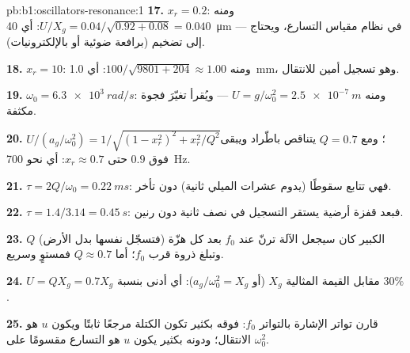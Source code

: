 \begin{solution}{pb:b1:oscillators-resonance:1}
\textbf{17.} $x_r = 0.2$: ومنه $U/X_g = 0.04/\sqrt{0.92 + 0.08} = 0.040$: أي
\qty{40}{\micro m} --- في نظام مقياس التسارع، ويحتاج إلى تضخيم (برافعة
ضوئية أو بالإلكترونيات).

\textbf{18.} $x_r = 10$: ومنه $100/\sqrt{9801 + 204} \approx 1.00$: أي \qty{1.0}{mm}،
وهو تسجيل أمين للانتقال.

\textbf{19.} $\omega_0 = \qty{6.3e3}{rad/s}$: ومنه $U = g/\omega_0^2 = \qty{2.5e-7}{m}$
--- ويُقرأ تغيّرَ فجوة مكثفة.

\textbf{20.} $U/(a_g/\omega_0^2) = 1/\sqrt{(1 - x_r^2)^2 + x_r^2/Q^2}$؛ ومع
$Q = 0.7$ يتناقص باطّراد ويبقى فوق $0.9$ حتى
$x_r \approx 0.7$: أي نحو \qty{700}{Hz}.

\textbf{21.} $\tau = 2Q/\omega_0 = \qty{0.22}{ms}$: فهي تتابع سقوطًا (يدوم عشرات
الميلي ثانية) دون تأخر.

\textbf{22.} $\tau = 1.4/3.14 = \qty{0.45}{s}$: فبعد قفزة أرضية يستقر
التسجيل في نصف ثانية دون رنين.

\textbf{23.} $Q$ الكبير كان سيجعل الآلة ترنّ عند $f_0$ بعد
كل هزّة (فتسجّل نفسها بدل الأرض) وتبلغ ذروة قرب
$f_0$؛ أما $Q \approx 0.7$ فمستوٍ وسريع.

\textbf{24.} $U = QX_g = 0.7X_g$ مقابل القيمة المثالية $X_g$ (أو $a_g/\omega_0^2
= X_g$): أي أدنى بنسبة $30\%$.

\textbf{25.} قارن تواتر الإشارة بالتواتر $f_0$: فوقه بكثير تكون
الكتلة مرجعًا ثابتًا ويكون $u$ هو الانتقال؛ ودونه بكثير يكون $u$
هو التسارع مقسومًا على $\omega_0^2$.
\end{solution}
